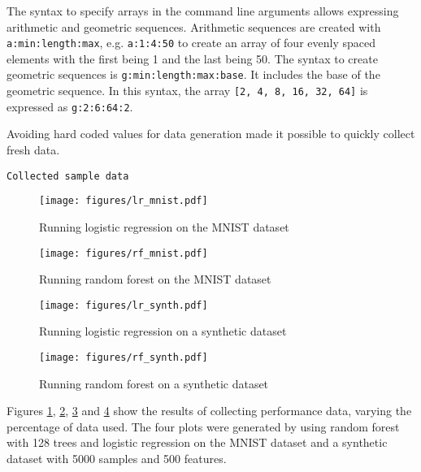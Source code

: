 \documentclass[a4paper,12pt,twoside,openright]{report}
\begin{document}
The syntax to specify arrays in the command line arguments allows expressing arithmetic and geometric sequences. Arithmetic sequences are created with \texttt{a:min:length:max}, e.g. \texttt{a:1:4:50} to create an array of four evenly spaced elements with the first being 1 and the last being 50. The syntax to create geometric sequences is \texttt{g:min:length:max:base}. It includes the base of the geometric sequence. In this syntax, the array \texttt{[2, 4, 8, 16, 32, 64]} is expressed as \texttt{g:2:6:64:2}.

Avoiding hard coded values for data generation made it possible to quickly collect fresh data.
	




\texttt{Collected sample data}

\begin{figure}
\centering
  \texttt{[image: figures/lr\_mnist.pdf]}
  \caption{Running logistic regression on the MNIST dataset}
  \label{sampledata1}
\end{figure}

\begin{figure}
\centering
  \texttt{[image: figures/rf\_mnist.pdf]}
  \caption{Running random forest on the MNIST dataset}
  \label{sampledata2}
\end{figure}

\begin{figure}
\centering
  \texttt{[image: figures/lr\_synth.pdf]}
  \caption{Running logistic regression on a synthetic dataset}
  \label{sampledata3}
\end{figure}

\begin{figure}
\centering
  \texttt{[image: figures/rf\_synth.pdf]}
  \caption{Running random forest on a synthetic dataset}
  \label{sampledata4}
\end{figure}



Figures \ref{sampledata1}, \ref{sampledata2}, \ref{sampledata3} and \ref{sampledata4} show the results of collecting performance data, varying the percentage of data used. The four plots were generated by using random forest with 128 trees and logistic regression on the MNIST dataset and a synthetic dataset with 5000 samples and 500 features.
\end{document}
